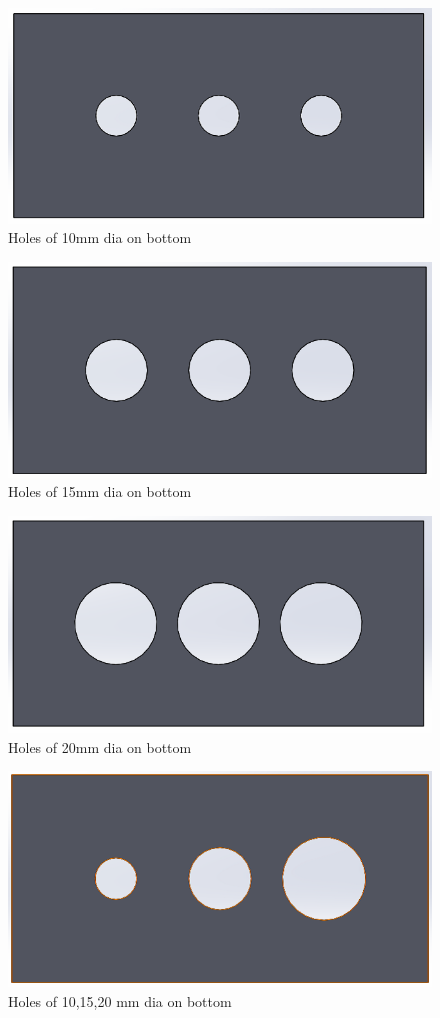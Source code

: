 \begin{figure}[h]
	\label{ss}    %
	\centering
	\includegraphics[width= 11 cm]{114.png}
	\caption{Holes of 10mm dia on bottom}
\end{figure}

\begin{figure}[h]
	\label{ss}    %
	\centering
	\includegraphics[width= 11 cm]{115.png}
	\caption{Holes of 15mm dia on bottom}
\end{figure}

\begin{figure}[h]
	\label{ss}    %
	\centering
	\includegraphics[width= 11 cm]{116.png}
	\caption{Holes of 20mm dia on bottom}
\end{figure}

\begin{figure}[h]
	\label{ss}    %
	\centering
	\includegraphics[width= 11 cm]{117.png}
	\caption{Holes of 10,15,20 mm dia on bottom}
\end{figure}

